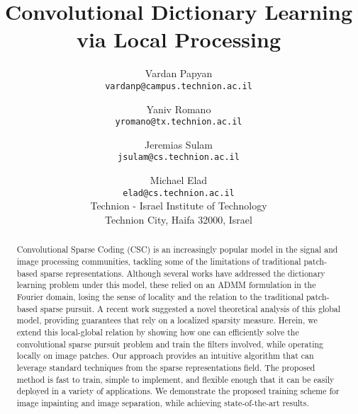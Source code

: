 \documentclass[10pt,twocolumn,letterpaper]{article}
\begin{document}
\title{Convolutional Dictionary Learning via Local Processing}

\author{
Vardan Papyan\\
{\tt\small vardanp@campus.technion.ac.il}
\and
Yaniv Romano\\
{\tt\small yromano@tx.technion.ac.il}
\and
Jeremias Sulam\\
{\tt\small jsulam@cs.technion.ac.il}
\and
Michael Elad\\
{\tt\small elad@cs.technion.ac.il}\\
Technion - Israel Institute of Technology\\
Technion City, Haifa 32000, Israel\\
}

\maketitle

\begin{abstract}
Convolutional Sparse Coding (CSC) is an increasingly popular model in the signal and image processing communities, tackling some of the limitations of traditional patch-based sparse representations. Although several works have addressed the dictionary learning problem under this model, these relied on an ADMM formulation in the Fourier domain, losing the sense of locality and the relation to the traditional patch-based sparse pursuit. A recent work suggested a novel theoretical analysis of this global model, providing guarantees that rely on a localized sparsity measure. Herein, we extend this local-global relation by showing how one can efficiently solve the convolutional sparse pursuit problem and train the filters involved, while operating locally on image patches. Our approach provides an intuitive algorithm that can leverage standard techniques from the sparse representations field. The proposed method is fast to train, simple to implement, and flexible enough that it can be easily deployed in a variety of applications. We demonstrate the proposed training scheme for image inpainting and image separation, while achieving state-of-the-art results.
\end{abstract}
\end{document}
